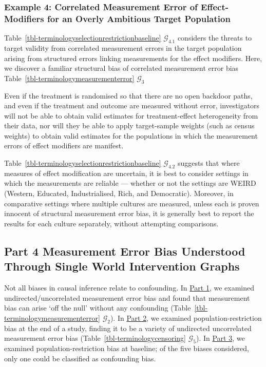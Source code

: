 \documentclass[
  single column]{article}
\begin{document}
\subsubsection{Example 4: Correlated Measurement Error of
Effect-Modifiers for an Overly Ambitious Target
Population}\label{example-4-correlated-measurement-error-of-effect-modifiers-for-an-overly-ambitious-target-population}

Table~\ref{tbl-terminologyselectionrestrictionbaseline}
\(\mathcal{G}_{4.1}\) considers the threats to target validity from
correlated measurement errors in the target population arising from
structured errors linking measurements for the effect modifiers. Here,
we discover a familiar structural bias of correlated measurement error
bias Table~\ref{tbl-terminologymeasurementerror} \(\mathcal{G}_3\)

Even if the treatment is randomised so that there are no open backdoor
paths, and even if the treatment and outcome are measured without error,
investigators will not be able to obtain valid estimates for
treatment-effect heterogeneity from their data, nor will they be able to
apply target-sample weights (such as census weights) to obtain valid
estimates for the populations in which the measurement errors of effect
modifiers are manifest.

Table~\ref{tbl-terminologyselectionrestrictionbaseline}
\(\mathcal{G}_{4.2}\) suggests that where measures of effect
modification are uncertain, it is best to consider settings in which the
measurements are reliable --- whether or not the settings are WEIRD
(Western, Educated, Industrialised, Rich, and Democratic). Moreover, in
comparative settings where multiple cultures are measured, unless each
is proven innocent of structural measurement error bias, it is generally
best to report the results for each culture separately, without
attempting comparisons.

\subsection{Part 4 Measurement Error Bias Understood Through Single
World Intervention Graphs}\label{id-sec-4}

Not all biases in causal inference relate to confounding. In
\hyperref[id-sec-1]{Part 1}, we examined undirected/uncorrelated
measurement error bias and found that measurement bias can arise `off
the null' without any confounding
(Table~\ref{tbl-terminologymeasurementerror} \(\mathcal{G}_2\)). In
\hyperref[id-sec-2]{Part 2}, we examined population-restriction bias at
the end of a study, finding it to be a variety of undirected
uncorrelated measurement error bias
(Table~\ref{tbl-terminologycensoring} \(\mathcal{G}_5\)). In
\hyperref[id-sec-3]{Part 3}, we examined population-restriction bias at
baseline; of the five biases considered, only one could be classified as
confounding bias.
\end{document}

